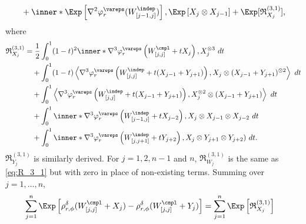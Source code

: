 \documentclass[aos]{imsart}
\begin{document}
\begin{appendix}
\begin{equation*}
\begin{aligned}
    & \quad + \inner*{ 
        \Exp\left[ \nabla^2 \varphi_r^\vareps(W_{[j-1,j]}^{\indep}) \right], 
        \Exp\left[ X_j \otimes X_{j-1} \right]}
    + \Exp[\mathfrak{R}_{X_j}^{(3,1)}],
\end{aligned}
\end{equation*}
where 
\begin{equation} \label{eq:R_3_1}
\begin{aligned}
    \mathfrak{R}_{X_j}^{(3,1)}
    & = \frac{1}{2} \int_0^1 (1-t)^2 \inner*{
        \nabla^3 \varphi_r^\vareps\left(
            W^\cmpl_{[j,j]} + t X_j
        \right),
        X_j^{\otimes 3}} ~dt \\
    & \quad + \int_0^1 (1-t) \left\langle
        \nabla^3 \varphi_r^\vareps\left(
            W_{[j,j]}^{\indep} + t (X_{j-1} + Y_{j+1}) 
        \right), 
        X_j \otimes (X_{j-1} + Y_{j+1})^{\otimes 2}
    \right\rangle ~dt \\
    & \quad + \int_0^1 \left\langle
        \nabla^3 \varphi_r^\vareps\left(
              W_{[j,j]}^{\indep} + t (X_{j-1} + Y_{j+1})
        \right), 
        X_j^{\otimes 2} \otimes (X_{j-1} + Y_{j+1})\right\rangle ~dt \\
    & \quad + \int_0^1 \inner*{
        \nabla^3 \varphi_r^\vareps\left(
            W_{[j-1,j]}^{\indep} + t X_{j-2}
        \right), 
        X_j \otimes X_{j-1} \otimes X_{j-2}} ~dt \\
    & \quad + \int_0^1 \inner*{
        \nabla^3 \varphi_r^\vareps\left(
            W_{[j,j+1]}^{\indep}+ t Y_{j+2}
        \right),
        X_j \otimes Y_{j+1} \otimes Y_{j+2})} ~dt.
\end{aligned}
\end{equation}
$\mathfrak{R}_{Y_j}^{(3,1)}$ is similarly derived. For $j = 1, 2, n-1$ and $n$, $\mathfrak{R}_{W_j}^{(3,1)}$ is the same as \cref{eq:R_3_1} but with zero in place of non-existing terms. 
Summing over $j = 1, \dots, n$,
\begin{equation*}
\begin{aligned}
    & \sum_{j=1}^n 
        \Exp \left[
        \rho_{r,\phi}^\delta(W^\cmpl_{[j,j]} + X_j)
        - \rho_{r,\phi}^\delta(W^\cmpl_{[j,j]} + Y_j)
    \right] 
    = \sum_{j=1}^n \Exp\left[\mathfrak{R}_{X_j}^{(3,1)}\right]
\end{aligned}
\end{equation*}


\end{appendix}
\end{document}
